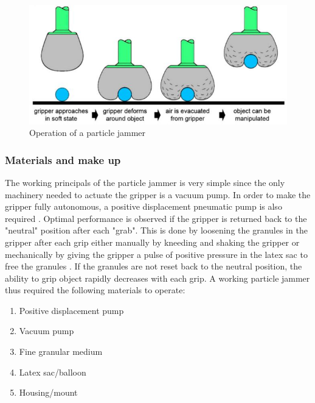 \documentclass[11pt,twocolumn]{article}
\begin{document}
\begin{figure}[h]
\centering
\includegraphics[scale=0.6]{jammer2}
\caption{Operation of a particle jammer}
\label{fig:jammer2}
\end{figure}
\subsubsection{Materials and make up}
The working principals of the particle jammer is very simple since the only machinery needed to actuate the gripper is a vacuum pump. In order to make the gripper fully autonomous, a positive displacement pneumatic pump is also required \cite{amend2012positive}. Optimal performance is observed if the gripper is returned back to the "neutral" position after each "grab". This is done by loosening the granules in the gripper after each grip either manually by kneeding and shaking the gripper or mechanically by giving the gripper a pulse of positive pressure in the latex sac to free the granules \cite{amend2012positive}. If the granules are not reset back to the neutral position, the ability to grip object rapidly decreases with each grip. A working particle jammer thus required the following materials to operate\cite{amend2012positive}:
\begin{enumerate}
\item Positive displacement pump
\item Vacuum pump
\item Fine granular medium
\item Latex sac/balloon
\item Housing/mount
\end{enumerate}
\end{document}
